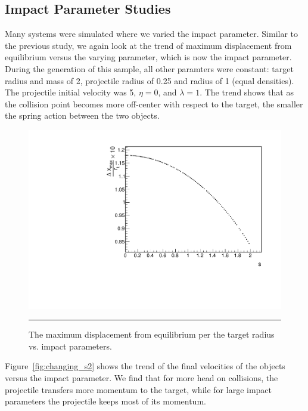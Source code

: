 \documentclass[aps,prl,floatfix,preprint,nofootinbib]{revtex4}
\begin{document}
\subsection{Impact Parameter Studies}
Many systems were simulated where we varied the impact parameter. Similar to the previous study, we again look at the trend of maximum displacement from equilibrium versus the varying parameter, which is now the impact parameter. During the generation of this sample, all other paramters were constant: target radius and mass of 2, projectile radius of 0.25 and radius of 1 (equal densities). The projectile initial velocity was 5, $\eta = 0$, and $\lambda = 1$. The trend shows that as the collision point becomes more off-center with respect to the target, the smaller the spring action between the two objects.
\begin{figure}[h!]
  \includegraphics[width=.45\linewidth]{plots/trend_plots/Eloss_vs_s.pdf}
                  {\par\nobreak\rule[9pt]{35em}{0.5pt}\vspace{-5mm}}
                  \caption{The maximum displacement from equilibrium per the target radius vs. impact parameters.}
                  \label{fig:changing_s1}  
\end{figure}
Figure~\ref{fig:changing_s2} shows the trend of the final velocities of the objects versus the impact parameter. We find that for more head on collisions, the projectile transfers more momentum to the target, while for large impact parameters the projectile keeps most of its momentum.
\end{document}

